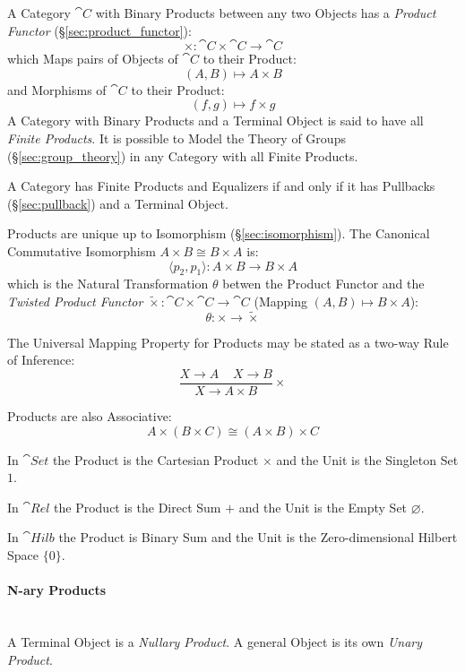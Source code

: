A Category $\cat{C}$ with Binary Products between any two Objects
has a \emph{Product Functor} (\S\ref{sec:product_functor}):
\[
  \times : \cat{C} \times \cat{C} \rightarrow \cat{C}
\]
which Maps pairs of Objects of $\cat{C}$ to their Product:
\[
  (A,B) \mapsto A \times B
\]
and Morphisms of $\cat{C}$ to their Product:
\[
  (f,g) \mapsto f \times g
\]
A Category with Binary Products and a Terminal Object is said to have
all \emph{Finite Products}. It is possible to Model the Theory of
Groups (\S\ref{sec:group_theory}) in any Category with all Finite
Products.

A Category has Finite Products and Equalizers if and only if it has
Pullbacks (\S\ref{sec:pullback}) and a Terminal Object. \cite{awodey06}

Products are unique up to Isomorphism (\S\ref{sec:isomorphism}). The
Canonical Commutative Isomorphism $A \times B \cong B \times A$ is:
\[
  \langle p_2, p_1 \rangle : A \times B \rightarrow B \times A
\]
which is the Natural Transformation $\theta$ betwen the Product
Functor and the \emph{Twisted Product Functor} $\tilde{\times} :
\cat{C} \times \cat{C} \rightarrow \cat{C}$ (Mapping $(A,B)
\mapsto B \times A$):
\[
  \theta : \times \rightarrow \tilde{\times}
\]

The Universal Mapping Property for Products may be stated as a two-way
Rule of Inference:
\[
  {
    \frac{X \rightarrow A \;\;\;\; X \rightarrow B}
    {X \rightarrow A \times B}
  }\times
\]

Products are also Associative:
\[
  A \times (B \times C) \cong (A \times B) \times C
\]

In $\cat{Set}$ the Product is the Cartesian Product $\times$ and the
Unit is the Singleton Set $1$.

In $\cat{Rel}$ the Product is the Direct Sum $+$ and the Unit is
the Empty Set $\varnothing$.

In $\cat{Hilb}$ the Product is Binary Sum and the Unit is the
Zero-dimensional Hilbert Space $\{ 0 \}$. %



\paragraph{N-ary Products}\label{sec:category_nary}
\hfill \\
A Terminal Object is a \emph{Nullary Product}. A general Object is its
own \emph{Unary Product}.

